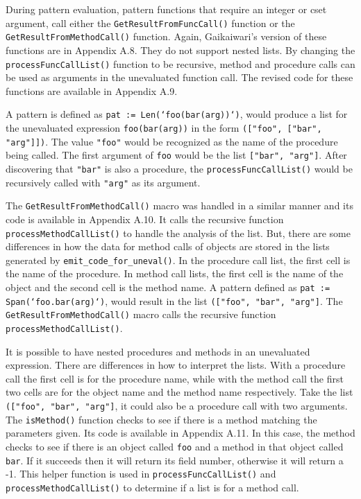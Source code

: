 \documentclass{article}
\begin{document}
During pattern evaluation, pattern functions that require an integer or cset argument, call either the  \texttt{GetResultFromFuncCall()} function or the \linebreak\texttt{GetResultFromMethodCall()} function.  Again, Gaikaiwari's version of these functions are in Appendix A.8.  They do not support nested lists.  By changing the \texttt{processFuncCallList()} function to be recursive, method and procedure calls can be used as arguments in the unevaluated function call.  The revised code for these functions are available in Appendix A.9.

A pattern is defined as \texttt{pat := Len(`foo(bar(arg))`)}, would produce a list for the unevaluated expression \texttt{foo(bar(arg))} in the form \texttt{(["foo", ["bar", "arg"]])}.  The value \texttt{"foo"} would be recognized as the name of the procedure being called.  The first argument of \texttt{foo} would be the list \texttt{["bar", "arg"]}.  After discovering that \texttt{"bar"} is also a procedure, the \texttt{processFuncCallList()} would be recursively called with \texttt{"arg"} as its argument.

The \texttt{GetResultFromMethodCall()} macro was handled in a similar manner and its code is available in Appendix A.10.  It calls the recursive function \texttt{processMethodCallList()} to handle the analysis of the list.  But, there are some differences in how the data for method calls of objects are stored in the lists generated by \texttt{emit\_code\_for\_uneval()}.  In the procedure call list, the first cell is the name of the procedure.  In method call lists, the first cell is the name of the object and the second cell is the method name.  A pattern defined as \texttt{pat := Span(`foo.bar(arg)`)}, would result in the list \texttt{(["foo", "bar", "arg"]}.  The \texttt{GetResultFromMethodCall()} macro calls the recursive function \linebreak\texttt{processMethodCallList()}. 

It is possible to have nested procedures and methods in an unevaluated expression.  There are differences in how to interpret the lists.  With a procedure call the first cell is for the procedure name, while with the method call the first two cells are for the object name and the method name respectively.  Take the list \texttt{(["foo", "bar", "arg"]}, it could also be a procedure call with two arguments.  The \texttt{isMethod()} function checks to see if there is a method matching the parameters given.  Its code is available in Appendix A.11.  In this case, the method checks to see if there is an object called \texttt{foo} and a method in that object called \texttt{bar}.  If it succeeds then it will return its field number, otherwise it will return a -1.  This helper function is used in \texttt{processFuncCallList()} and \texttt{processMethodCallList()} to determine if a list is for a method call.
\end{document}
